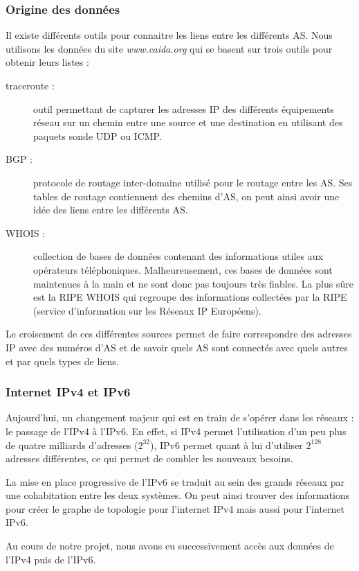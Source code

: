 \subsubsection{Origine des donn\'ees}
\par
Il existe diff\'erents outils pour connaitre les liens entre les diff\'erents AS. Nous utilisons les donn\'ees du site \textit{www.caida.org} qui se basent sur trois outils pour obtenir leurs listes :
\begin{description}
 \item[traceroute : ] outil permettant de capturer les adresses IP des diff\'erents \'equipements r\'eseau sur un chemin entre une source et une destination en utilisant des paquets sonde UDP ou ICMP.
 \item[BGP : ] protocole de routage inter-domaine utilis\'e pour le routage entre les AS. Ses tables de routage contiennent des chemins d'AS, on peut ainsi avoir une idée des liens entre les diff\'erents AS.
 \item[WHOIS : ] collection de bases de donn\'ees contenant des informations utiles aux op\'erateurs t\'el\'ephoniques. Malheureusement, ces bases de donn\'ees sont maintenues \`a la main et ne  sont donc pas toujours tr\`es fiables. La plus sûre est la RIPE WHOIS qui regroupe des informations collect\'ees par la RIPE (service d'information sur les R\'eseaux IP Europ\'eens).
\end{description}
\par
Le croisement de ces diff\'erentes sources permet de faire correspondre des adresses IP avec des num\'eros d'AS et de savoir quels AS sont connect\'es avec quels autres et par quels types de liens.

\subsubsection{Internet IPv4 et IPv6}
\par
Aujourd'hui, un changement majeur qui est en train de s'op\'erer dans les r\'eseaux : le passage de l'IPv4 \`a l'IPv6. En effet, si IPv4 permet l'utilisation d'un peu plus de quatre milliards d'adresses ($2^{32}$), IPv6 permet quant \`a lui d'utiliser $2^{128}$ adresses diff\'erentes, ce qui permet de combler les nouveaux besoins.
\par
La mise en place progressive de l'IPv6 se traduit au sein des grands r\'eseaux par une cohabitation entre les deux syst\`emes. On peut ainsi trouver des informations pour cr\'eer le graphe de topologie pour l'internet IPv4 mais aussi pour l'internet IPv6.
\par
Au cours de notre projet, nous avons eu successivement acc\`es aux donn\'ees de l'IPv4 puis de l'IPv6.
% 
